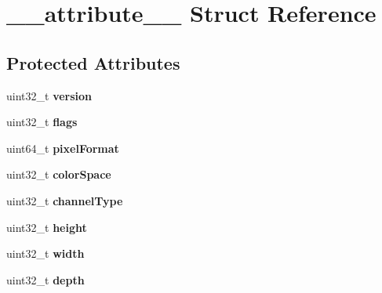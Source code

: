 \hypertarget{struct____attribute____}{\section{\-\_\-\-\_\-attribute\-\_\-\-\_\- Struct Reference}
\label{struct____attribute____}
}
\subsection*{Protected Attributes}
\begin{DoxyCompactItemize}
\item 
\hypertarget{struct____attribute_____a31d2a2fad37f62ce3919384a9a9845bb}{uint32\-\_\-t {\bfseries version}}\label{struct____attribute_____a31d2a2fad37f62ce3919384a9a9845bb}

\item 
\hypertarget{struct____attribute_____a0e55029d7a88d0463836e1827d4027f4}{uint32\-\_\-t {\bfseries flags}}\label{struct____attribute_____a0e55029d7a88d0463836e1827d4027f4}

\item 
\hypertarget{struct____attribute_____a82fcb5ce3172b2acbbe90be79eb630ed}{uint64\-\_\-t {\bfseries pixel\-Format}}\label{struct____attribute_____a82fcb5ce3172b2acbbe90be79eb630ed}

\item 
\hypertarget{struct____attribute_____a0c3fcb1f2e44b8c3beffba8048d147a5}{uint32\-\_\-t {\bfseries color\-Space}}\label{struct____attribute_____a0c3fcb1f2e44b8c3beffba8048d147a5}

\item 
\hypertarget{struct____attribute_____ab400196d5e02b6a1360900bb953133a1}{uint32\-\_\-t {\bfseries channel\-Type}}\label{struct____attribute_____ab400196d5e02b6a1360900bb953133a1}

\item 
\hypertarget{struct____attribute_____ad1b566fea02ecf0cc38ff566ec5632e6}{uint32\-\_\-t {\bfseries height}}\label{struct____attribute_____ad1b566fea02ecf0cc38ff566ec5632e6}

\item 
\hypertarget{struct____attribute_____abb412891565d96f80d0306c413454536}{uint32\-\_\-t {\bfseries width}}\label{struct____attribute_____abb412891565d96f80d0306c413454536}

\item 
\hypertarget{struct____attribute_____a1d6d198ae396abffce7fdf98f5caa1e8}{uint32\-\_\-t {\bfseries depth}}\label{struct____attribute_____a1d6d198ae396abffce7fdf98f5caa1e8}


\end{DoxyCompactItemize}
